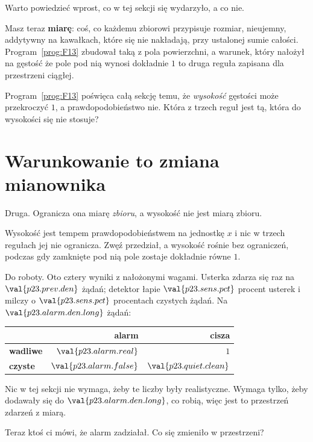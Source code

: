\begin{fr}
Warto powiedzieć wprost, co w tej sekcji się wydarzyło, a co nie.

Masz teraz \textbf{miarę}: coś, co każdemu zbiorowi przypisuje rozmiar,
nieujemny, addytywny na kawałkach, które się nie nakładają, przy ustalonej
sumie całości. Program~\ref{prog:F13} zbudował taką z pola powierzchni, a
warunek, który nałożył na gęstość \dash{} że pole pod nią wynosi dokładnie
$1$ \dash{} to druga reguła zapisana dla przestrzeni ciągłej.


Program~\ref{prog:F13} poświęca całą sekcję temu, że \emph{wysokość} gęstości
może przekroczyć $1$, a prawdopodobieństwo nie. Która z trzech reguł jest tą,
która do wysokości się nie stosuje?
\dotline
\nextframe
\end{fr}

\section{Warunkowanie to zmiana mianownika}
\label{sec:P23-conditioning}

\begin{fr}
\begin{ansblock}
Druga. Ogranicza ona miarę \emph{zbioru}, a wysokość nie jest miarą zbioru.
\end{ansblock}

Wysokość jest tempem \dash{} prawdopodobieństwem na jednostkę $x$ \dash{} i
nic w trzech regułach jej nie ogranicza. Zwęź przedział, a wysokość rośnie bez
ograniczeń, podczas gdy zamknięte pod nią pole zostaje dokładnie równe $1$.

Do roboty. Oto cztery wyniki z nałożonymi wagami. Usterka zdarza się raz na
$\val{p23.prev.den}$ żądań; detektor łapie $\val{p23.sens.pct}$ procent
usterek i milczy o $\val{p23.sens.pct}$ procentach czystych żądań. Na
$\val{p23.alarm.den.long}$ żądań:

\begin{center}
\begin{tabular}{lrr}
\toprule
& \textbf{alarm} & \textbf{cisza} \\
\midrule
\textbf{wadliwe} & $\val{p23.alarm.real}$ & $1$ \\
\textbf{czyste}  & $\val{p23.alarm.false}$ & $\val{p23.quiet.clean}$ \\
\bottomrule
\end{tabular}
\end{center}

Nic w tej sekcji nie wymaga, żeby te liczby były realistyczne. Wymaga tylko,
żeby dodawały się do $\val{p23.alarm.den.long}$, co robią, więc jest to
przestrzeń zdarzeń z miarą.

Teraz ktoś ci mówi, że alarm zadziałał. Co się zmieniło w przestrzeni?
\dotline
\nextframe
\end{fr}

